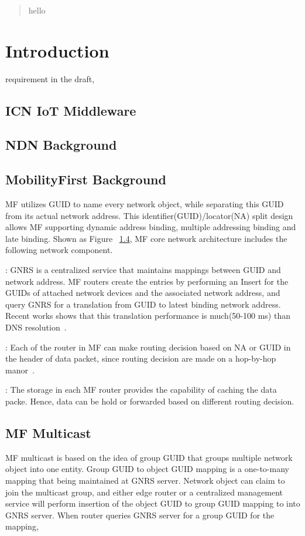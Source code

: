\begin{abstract}
hello
\end{abstract}

\section{Introduction}
requirement in the draft, 
\subsection{ICN IoT Middleware}
\subsection{NDN Background}
\subsection{MobilityFirst Background}
MF utilizes GUID to name every network object, while separating this GUID from its actual network address. This identifier(GUID)/locator(NA) split design allows MF supporting dynamic address binding, multiple addressing binding and late binding. Shown as Figure ~\ref{}, MF core network architecture includes the following network component.

\vspace{1mm}: GNRS is a centralized service that maintains mappings between GUID and network address. MF routers create the entries by performing an Insert for the GUIDs of attached network devices and the associated network address, and query GNRS for a translation from GUID to latest binding network address. Recent works shows that this translation performance is much(50-100 ms) than DNS resolution~\cite{vu2012dmap}.

\vspace{1mm}: Each of the router in MF can make routing decision based on NA or GUID in the header of data packet, since routing decision are made on a hop-by-hop manor~\cite{nelson2011gstar}.

\vspace{1mm}: The storage in each MF router provides the capability of caching the data packe. Hence, data can be hold or forwarded based on different routing decision.
\subsection{MF Multicast}
MF multicast is based on the idea of group GUID that groups multiple network object into one entity. Group GUID  to object GUID mapping is a one-to-many mapping that being maintained at GNRS server. Network object can claim to join the multicast group, and either edge router or a centralized management service will perform insertion of the object GUID to group GUID mapping to into GNRS server. When router queries GNRS server for a group GUID for the mapping, 